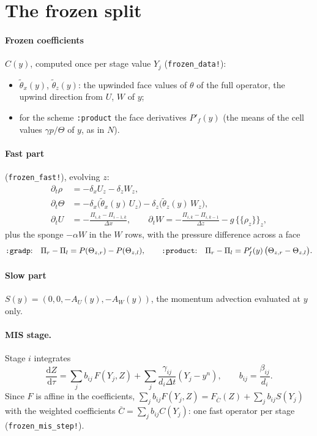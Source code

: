 \documentclass[11pt,a4paper]{article}
\newcommand{\dt}{\Delta t}
\newcommand{\avg}[1]{\{\!\{#1\}\!\}}
\newcommand{\code}[1]{\texttt{#1}}
\begin{document}
\section{The frozen split}
\paragraph{Frozen coefficients} $C(y)$, computed once per stage value $Y_j$ (\code{frozen\_data!}):
\begin{itemize}
\item $\tilde\theta_x(y)$, $\tilde\theta_z(y)$: the upwinded face values of $\theta$ of the full operator, the upwind
  direction from $U$, $W$ of $y$;
\item for the scheme \code{:product} the face derivatives $P'_f(y)$ (the means of the cell values $\gamma p/\Theta$ of
  $y$, as in $N$).
\end{itemize}

\paragraph{Fast part} (\code{frozen\_fast!}), evolving $z$:
\begin{align*}
\partial_t\rho&=-\delta_xU_z-\delta_zW_z,\\
\partial_t\Theta&=-\delta_x\big(\tilde\theta_x(y)\,U_z\big)-\delta_z\big(\tilde\theta_z(y)\,W_z\big),\\
\partial_tU&=-\frac{\Pi_{i,k}-\Pi_{i-1,k}}{\Delta x},\qquad
\partial_tW=-\frac{\Pi_{i,k}-\Pi_{i,k-1}}{\Delta z}-g\,\avg{\rho_z}_z,
\end{align*}
plus the sponge $-\alpha W$ in the $W$ rows, with the pressure difference across a face
\[
\text{\code{:gradp}:}\quad \Pi_r-\Pi_l=P(\Theta_{z,r})-P(\Theta_{z,l}),\qquad
\text{\code{:product}:}\quad \Pi_r-\Pi_l=P'_f(y)\,\big(\Theta_{z,r}-\Theta_{z,l}\big).
\]
\paragraph{Slow part} $S(y)=(0,0,-A_U(y),-A_W(y))$, the momentum advection evaluated at $y$ only.

\paragraph{MIS stage.} Stage $i$ integrates
\[
\frac{\mathrm dZ}{\mathrm d\tau}=\sum_jb_{ij}\,F(Y_j,Z)+\sum_j\frac{\gamma_{ij}}{d_i\dt}(Y_j-y^n),\qquad b_{ij}=\frac{\beta_{ij}}{d_i}.
\]
Since $F$ is affine in the coefficients, $\sum_jb_{ij}F(Y_j,Z)=F_{\bar C}(Z)+\sum_jb_{ij}S(Y_j)$ with the weighted
coefficients $\bar C=\sum_jb_{ij}C(Y_j)$: one fast operator per stage
(\code{frozen\_mis\_step!}).
\end{document}
